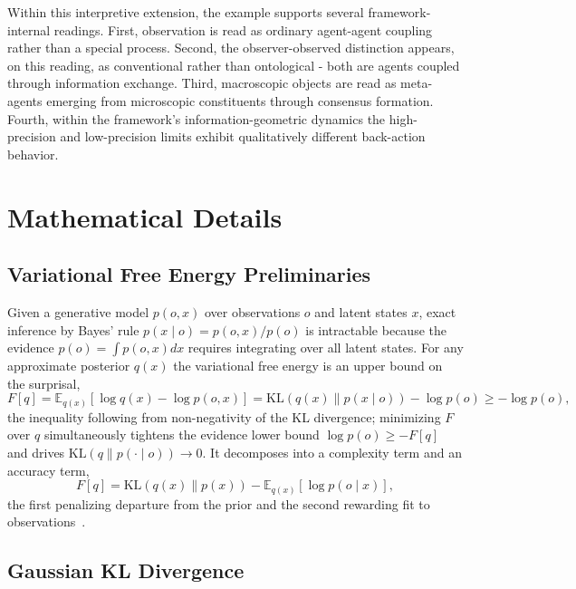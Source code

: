 \documentclass[11pt]{article}
\begin{document}
Within this interpretive extension, the example supports several framework-internal readings. First, observation is read as ordinary agent-agent coupling rather than a special process. Second, the observer-observed distinction appears, on this reading, as conventional rather than ontological - both are agents coupled through information exchange. Third, macroscopic objects are read as meta-agents emerging from microscopic constituents through consensus formation. Fourth, within the framework's information-geometric dynamics the high-precision and low-precision limits exhibit qualitatively different back-action behavior.

\section{Mathematical Details}
\label{app:math}

\subsection{Variational Free Energy Preliminaries}
\label{app:variational_prelim}

Given a generative model $p(o, x)$ over observations $o$ and latent states $x$, exact inference by Bayes' rule $p(x \mid o) = p(o, x)/p(o)$ is intractable because the evidence $p(o) = \int p(o, x)  dx$ requires integrating over all latent states. For any approximate posterior $q(x)$ the variational free energy is an upper bound on the surprisal,
\begin{equation}
F[q] = \mathbb{E}_{q(x)}[\log q(x) - \log p(o, x)] = \mathrm{KL}(q(x) \| p(x \mid o)) - \log p(o) \geq -\log p(o),
\end{equation}
the inequality following from non-negativity of the KL divergence; minimizing $F$ over $q$ simultaneously tightens the evidence lower bound $\log p(o) \geq -F[q]$ and drives $\mathrm{KL}(q \| p(\cdot \mid o)) \to 0$. It decomposes into a complexity term and an accuracy term,
\begin{equation}
F[q] = \mathrm{KL}(q(x) \| p(x)) - \mathbb{E}_{q(x)}[\log p(o \mid x)],
\end{equation}
the first penalizing departure from the prior and the second rewarding fit to observations~\cite{Friston2010, parr2022active}.

\subsection{Gaussian KL Divergence}
\label{app:gaussian_kl}
\end{document}
